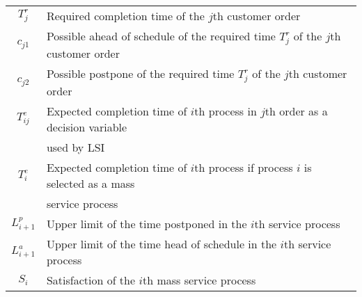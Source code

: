 \documentclass{llncs}
\begin{document}
\begin{center}
\begin{tabular}{c|l}
$T_j^r$\hspace{1cm} & \hspace{1cm}Required completion time  of  the $j$th  customer  order \hspace{4cm}\\
$c_{j1}$\hspace{1cm} & \hspace{1cm}Possible  ahead  of  schedule of the required time $T_j^r$ of the $j$th  customer  order\hspace{4cm}\\
$c_{j2}$\hspace{1cm} & \hspace{1cm}Possible  postpone of the required time $T_j^r$ of the $j$th  customer  order\hspace{4cm}\\
$T_{ij}^e$\hspace{1cm} & \hspace{1cm}Expected completion time of $i$th process in $j$th order as a decision variable \hspace{4cm}\\
\hspace{1cm} & \hspace{1cm}used by LSI \hspace{4cm}\\
$T_{i}^e$\hspace{1cm} & \hspace{1cm}Expected completion time of $i$th process if process $i$ is selected as a mass \hspace{4cm}\\
\hspace{1cm} & \hspace{1cm}service process \hspace{4cm}\\
$L_{i+1}^p$\hspace{1cm} & \hspace{1cm}Upper limit of the time postponed in the $i$th service process\hspace{4cm}\\
$L_{i+1}^a$\hspace{1cm} & \hspace{1cm}Upper limit of the time head of schedule in the $i$th service process\hspace{4cm}\\
$S_i$\hspace{1cm} & \hspace{1cm}Satisfaction of the $i$th mass service process  \hspace{4cm}\\

\end{tabular}
\end{center}
\end{document}
